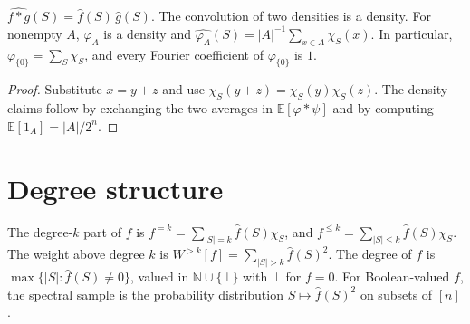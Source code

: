 \begin{theorem}
  \label{thm:analysis-convolution}
  \leanok
  $\widehat{f * g}(S) = \widehat{f}(S)\,\widehat{g}(S)$. The convolution of two
  densities is a density. For nonempty $A$, $\varphi_A$ is a density and
  $\widehat{\varphi_A}(S) = |A|^{-1} \sum_{x \in A} \chi_S(x)$. In particular,
  $\varphi_{\{0\}} = \sum_S \chi_S$, and every Fourier coefficient of
  $\varphi_{\{0\}}$ is $1$.
\end{theorem}
\begin{proof}
  \leanok
  Substitute $x = y + z$ and use $\chi_S(y + z) = \chi_S(y)\chi_S(z)$. The
  density claims follow by exchanging the two averages in
  $\mathbb{E}[\varphi * \psi]$ and by computing $\mathbb{E}[1_A] = |A|/2^n$.
\end{proof}

\section{Degree structure}

\begin{definition}
  \label{def:analysis-degree-part}
  \leanok
  The degree-$k$ part of $f$ is $f^{=k} = \sum_{|S| = k} \widehat{f}(S) \chi_S$,
  and $f^{\le k} = \sum_{|S| \le k} \widehat{f}(S) \chi_S$. The weight above
  degree $k$ is $W^{>k}[f] = \sum_{|S| > k} \widehat{f}(S)^2$. The degree of $f$ is
  $\max\{|S| : \widehat{f}(S) \neq 0\}$, valued in $\mathbb{N} \cup \{\bot\}$ with
  $\bot$ for $f = 0$. For Boolean-valued $f$, the spectral sample is the
  probability distribution $S \mapsto \widehat{f}(S)^2$ on subsets of $[n]$.
\end{definition}

